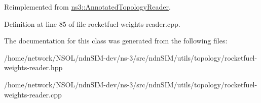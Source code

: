 Reimplemented from \hyperlink{classns3_1_1AnnotatedTopologyReader_a6284f11d2dce1e96c66b05082edeb444}{ns3\+::\+Annotated\+Topology\+Reader}.



Definition at line 85 of file rocketfuel-\/weights-\/reader.\+cpp.



The documentation for this class was generated from the following files\+:\begin{DoxyCompactItemize}
\item 
/home/network/\+N\+S\+O\+L/ndn\+S\+I\+M-\/dev/ns-\/3/src/ndn\+S\+I\+M/utils/topology/rocketfuel-\/weights-\/reader.\+hpp\item 
/home/network/\+N\+S\+O\+L/ndn\+S\+I\+M-\/dev/ns-\/3/src/ndn\+S\+I\+M/utils/topology/rocketfuel-\/weights-\/reader.\+cpp\end{DoxyCompactItemize}

